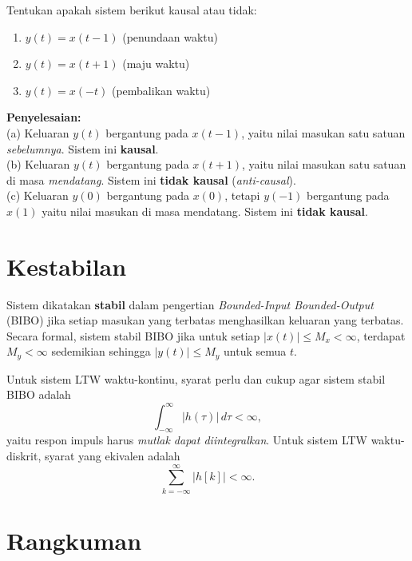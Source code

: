 \begin{exmp}
Tentukan apakah sistem berikut kausal atau tidak:
\begin{enumerate}
\item[(a)] $y(t) = x(t-1)$ \quad (penundaan waktu)
\item[(b)] $y(t) = x(t+1)$ \quad (maju waktu)
\item[(c)] $y(t) = x(-t)$ \quad (pembalikan waktu)
\end{enumerate}

\textbf{Penyelesaian:}\\
(a) Keluaran $y(t)$ bergantung pada $x(t-1)$, yaitu nilai masukan satu satuan \textit{sebelumnya}. Sistem ini \textbf{kausal}.\\
(b) Keluaran $y(t)$ bergantung pada $x(t+1)$, yaitu nilai masukan satu satuan di masa \textit{mendatang}. Sistem ini \textbf{tidak kausal} (\textit{anti-causal}).\\
(c) Keluaran $y(0)$ bergantung pada $x(0)$, tetapi $y(-1)$ bergantung pada $x(1)$ yaitu nilai masukan di masa mendatang. Sistem ini \textbf{tidak kausal}.
\end{exmp}

\section{Kestabilan}

Sistem dikatakan \textbf{stabil} dalam pengertian \textit{Bounded-Input Bounded-Output} (BIBO) jika setiap masukan yang terbatas menghasilkan keluaran yang terbatas. Secara formal, sistem stabil BIBO jika untuk setiap $|x(t)| \le M_x < \infty$, terdapat $M_y < \infty$ sedemikian sehingga $|y(t)| \le M_y$ untuk semua $t$.

Untuk sistem LTW waktu-kontinu, syarat perlu dan cukup agar sistem stabil BIBO adalah
\begin{equation}
\int_{-\infty}^{\infty} |h(\tau)|\,d\tau < \infty,
\end{equation}
yaitu respon impuls harus \textit{mutlak dapat diintegralkan}. Untuk sistem LTW waktu-diskrit, syarat yang ekivalen adalah
\begin{equation}
\sum_{k=-\infty}^{\infty} |h[k]| < \infty.
\end{equation}



\section*{Rangkuman}

